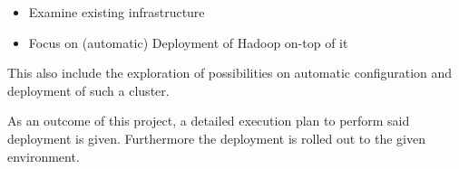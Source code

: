 \begin{itemize}
    \item Examine existing infrastructure
    \item Focus on (automatic) Deployment of Hadoop on-top of it
\end{itemize}

This also include the exploration of possibilities on automatic configuration and deployment of such a cluster.

As an outcome of this project, 
a detailed execution plan to perform said deployment is given.
Furthermore the deployment is rolled out to the given environment. 



